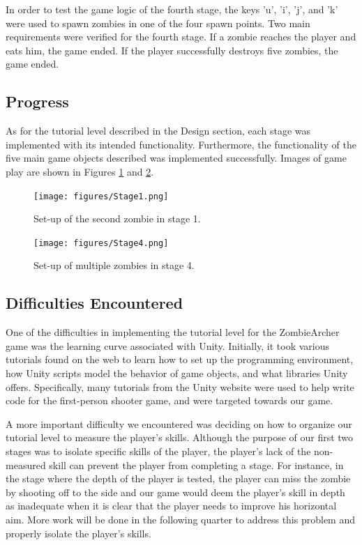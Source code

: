 \documentclass[titlepage, 12pt]{scrartcl}
\begin{document}
    \par In order to test the game logic of the fourth stage, the keys 'u', 'i', 'j', and 'k' were used to spawn zombies in one of the four spawn points. Two main requirements were verified for the fourth stage. If a zombie reaches the player and eats him, the game ended. If the player successfully destroys five zombies, the game ended. 
    

    \subsection{Progress}
    As for the tutorial level described in the Design section, each stage was implemented with its intended functionality. Furthermore, the functionality of the five main game objects described was implemented successfully. Images of game play are shown in Figures
    \ref{fig:Stage1} and \ref{fig:Stage4}. 
    
    \begin{figure}
            \centering
            \texttt{[image: figures/Stage1.png]}
            \caption{Set-up of the second zombie in stage 1.}
            \label{fig:Stage1}
        \end{figure}
        
        \begin{figure}
            \centering
            \texttt{[image: figures/Stage4.png]}
            \caption{Set-up of multiple zombies in stage 4.}
            \label{fig:Stage4}
        \end{figure}
    
    \subsection{Difficulties Encountered}
    One of the difficulties in implementing the tutorial level for the ZombieArcher game was the learning curve associated with Unity. Initially, it took various tutorials found on the web to learn how to set up the programming environment, how Unity scripts model the behavior of game objects, and what libraries Unity offers. Specifically, many tutorials from the Unity website were used to help write code for the first-person shooter game, and were targeted towards our game. \cite{unity_tut}
    
    \par A more important difficulty we encountered was deciding on how to organize our tutorial level to measure the player's skills. Although the purpose of our first two stages was to isolate specific skills of the player, the player's lack of the non-measured skill can prevent the player from completing a stage. For instance, in the stage where the depth of the player is tested, the player can miss the zombie by shooting off to the side and our game would deem the player's skill in depth as inadequate when it is clear that the player needs to improve his horizontal aim. More work will be done in the following quarter to address this problem and properly isolate the player's skills. 
    
\end{document}
